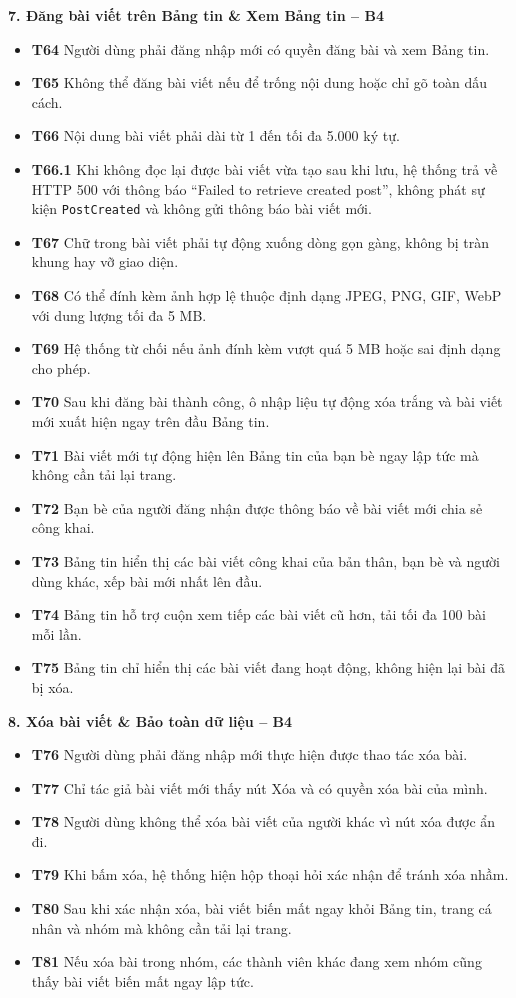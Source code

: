 \documentclass[11pt,a4paper]{article}
\begin{document}
\smallskip
\noindent\textbf{7. Đăng bài viết trên Bảng tin \& Xem Bảng tin -- B4}
\begin{itemize}[leftmargin=0.9cm, label=$\bullet$, itemsep=2pt, topsep=4pt]
    \item \textbf{T64} Người dùng phải đăng nhập mới có quyền đăng bài và xem Bảng tin.
    \item \textbf{T65} Không thể đăng bài viết nếu để trống nội dung hoặc chỉ gõ toàn dấu cách.
    \item \textbf{T66} Nội dung bài viết phải dài từ 1 đến tối đa 5.000 ký tự.
    \item \textbf{T66.1} Khi không đọc lại được bài viết vừa tạo sau khi lưu, hệ thống trả về HTTP 500 với thông báo ``Failed to retrieve created post'', không phát sự kiện \texttt{PostCreated} và không gửi thông báo bài viết mới.
    \item \textbf{T67} Chữ trong bài viết phải tự động xuống dòng gọn gàng, không bị tràn khung hay vỡ giao diện.
    \item \textbf{T68} Có thể đính kèm ảnh hợp lệ thuộc định dạng JPEG, PNG, GIF, WebP với dung lượng tối đa 5 MB.
    \item \textbf{T69} Hệ thống từ chối nếu ảnh đính kèm vượt quá 5 MB hoặc sai định dạng cho phép.
    \item \textbf{T70} Sau khi đăng bài thành công, ô nhập liệu tự động xóa trắng và bài viết mới xuất hiện ngay trên đầu Bảng tin.
    \item \textbf{T71} Bài viết mới tự động hiện lên Bảng tin của bạn bè ngay lập tức mà không cần tải lại trang.
    \item \textbf{T72} Bạn bè của người đăng nhận được thông báo về bài viết mới chia sẻ công khai.
    \item \textbf{T73} Bảng tin hiển thị các bài viết công khai của bản thân, bạn bè và người dùng khác, xếp bài mới nhất lên đầu.
    \item \textbf{T74} Bảng tin hỗ trợ cuộn xem tiếp các bài viết cũ hơn, tải tối đa 100 bài mỗi lần.
    \item \textbf{T75} Bảng tin chỉ hiển thị các bài viết đang hoạt động, không hiện lại bài đã bị xóa.
\end{itemize}
\smallskip
\noindent\textbf{8. Xóa bài viết \& Bảo toàn dữ liệu -- B4}
\begin{itemize}[leftmargin=0.9cm, label=$\bullet$, itemsep=2pt, topsep=4pt]
    \item \textbf{T76} Người dùng phải đăng nhập mới thực hiện được thao tác xóa bài.
    \item \textbf{T77} Chỉ tác giả bài viết mới thấy nút Xóa và có quyền xóa bài của mình.
    \item \textbf{T78} Người dùng không thể xóa bài viết của người khác vì nút xóa được ẩn đi.
    \item \textbf{T79} Khi bấm xóa, hệ thống hiện hộp thoại hỏi xác nhận để tránh xóa nhầm.
    \item \textbf{T80} Sau khi xác nhận xóa, bài viết biến mất ngay khỏi Bảng tin, trang cá nhân và nhóm mà không cần tải lại trang.
    \item \textbf{T81} Nếu xóa bài trong nhóm, các thành viên khác đang xem nhóm cũng thấy bài viết biến mất ngay lập tức.
\end{itemize}
\end{document}
